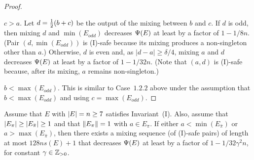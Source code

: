 \begin{proof}
\begin{description}
\begin{description}
			\item{} $c>a$.
			Let $d={\textstyle\frac{1}{2}}(b+c)$ be the output of the mixing between $b$ and $c$.
			If $d$ is odd, then mixing $d$ and $\min(E_{odd})$ decreases ${\Psi}(E)$ 
			at least by a factor of $1-1/8n$. (Pair $(d, \min(E_{odd}))$ is (I)-safe
			because its mixing produces a non-singleton other than $a$.)
			Otherwise, $d$ is even and, as $|d-a|\geq\delta/4$, 
			mixing $a$ and $d$ decreases ${\Psi}(E)$ at least by a factor of $1-1/32n$.
			(Note that $(a,d)$ is (I)-safe because, after its mixing, $a$ remains non-singleton.)
		\end{description}
		
	\end{description}

	\noindent{} $b < \max(E_{odd})$.
	This is similar to Case~$1.2.2$ above under the assumption that $b < \max(E_{odd})$
	and using $c=\max(E_{odd})$.
\end{proof}


\begin{lemma}\label{lem: far mix in E odd non-overlapping E even}
	Assume that $E$ with ${|E|}=n\geq 7$ satisfies Invariant~(I).
	Also, assume that ${|E_{\pi}|}\geq{|E_{\bar{\pi}}|}\geq1$ and
	that ${\|E_\pi\|} = 1$ with $a\in E_\pi$.
	If either $a < \min(E_{\bar{\pi}})$ or $a>\max(E_{\bar{\pi}})$,	then there exists
	a mixing sequence (of (I)-safe pairs) of length at most $128ns(E) + 1$
	that decreases ${\Psi}(E)$ at least by a factor of $1-1/32\gamma^2n$, 
	for constant $\gamma\in{\mathbb{Z}_{> 0}}$.
\end{lemma}

